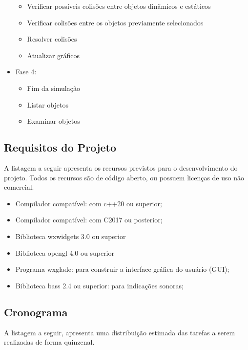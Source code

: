 \begin{itemize}
\begin{itemize}
\item Verificar possíveis colisões entre objetos dinãmicos e estáticos
\item Verificar colisões entre os objetos previamente selecionados
\item Resolver colisões
\item Atualizar gráficos
\end{itemize}
\item Fase 4:
\begin{itemize}
\item Fim da simulação
\item Listar objetos
\item Examinar objetos
\end{itemize}
\end{itemize}

\subsection{Requisitos do Projeto}

A listagem a seguir apresenta os recursos previstos para o desenvolvimento do projeto. Todos os  recursos são  de código aberto, ou possuem licenças de uso não comercial.

\begin{itemize}
\item Compilador compatível: com c++20 ou superior;
\item Compilador compatível: com C2017 ou posterior;
\item Biblioteca wxwidgets 3.0 ou superior
\item Biblioteca opengl 4.0 ou superior
\item Programa wxglade: para construir a interface gráfica do usuário (GUI);
\item Biblioteca bass 2.4 ou superior: para indicações sonoras;
\end{itemize}

\subsection{Cronograma}

A listagem a seguir, apresenta uma distribuição estimada das tarefas a serem
realizadas de forma quinzenal.

